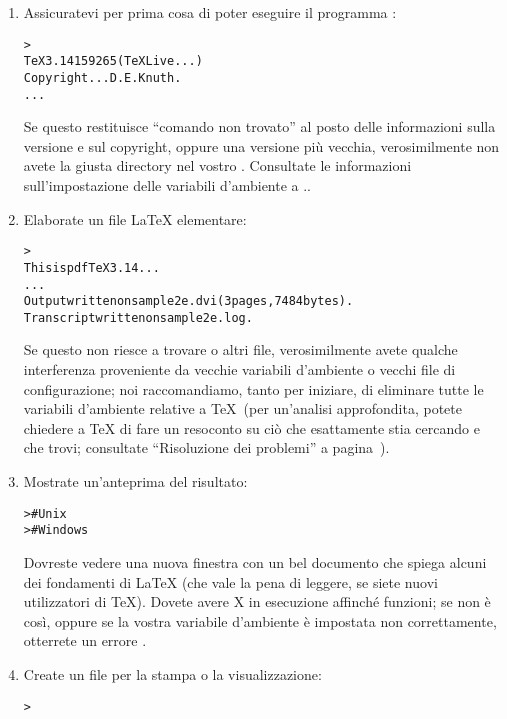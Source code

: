 \documentclass{article}
\begin{document}
\begin{enumerate}

\item Assicuratevi per prima cosa di poter eseguire il programma
:
\begin{alltt}
> 
TeX 3.14159265 (TeX Live ...)
Copyright ... D.E. Knuth.
...
\end{alltt}
Se questo restituisce ``comando non trovato'' al posto delle informazioni
sulla versione e sul copyright, oppure una versione più vecchia,
verosimilmente non avete la giusta directory  nel vostro
. Consultate le informazioni sull'impostazione delle
variabili d'ambiente a \p.\pageref{sec:env}.

\item Elaborate un file \LaTeX{} elementare:
\begin{alltt}
> 
This is pdfTeX 3.14...
...
Output written on sample2e.dvi (3 pages, 7484 bytes).
Transcript written on sample2e.log.
\end{alltt}
Se questo non riesce a trovare  o altri file,
verosimilmente avete qualche interferenza proveniente da vecchie variabili
d'ambiente o vecchi file di configurazione; noi raccomandiamo, tanto per
iniziare, di eliminare tutte le variabili d'ambiente relative a \TeX\ (per
un'analisi approfondita, potete chiedere a \TeX{} di fare un resoconto su
ciò che esattamente stia cercando e che trovi; consultate ``Risoluzione
dei problemi'' a pagina~\pageref{sec:debugging}).

\item Mostrate un'anteprima del risultato:
\begin{alltt}
>     # Unix
>   # Windows
\end{alltt}
Dovreste vedere una nuova finestra con un bel documento che spiega alcuni
dei fondamenti di \LaTeX{} (che vale la pena di leggere, se siete nuovi
utilizzatori di \TeX). Dovete avere X in esecuzione affinché 
funzioni; se non è così, oppure se la vostra variabile d'ambiente
 è impostata non correttamente, otterrete un errore
.

\item Create un file \PS{} per la stampa o la visualizzazione:
\begin{alltt}
> 
\end{alltt}


\end{enumerate}
\end{document}
